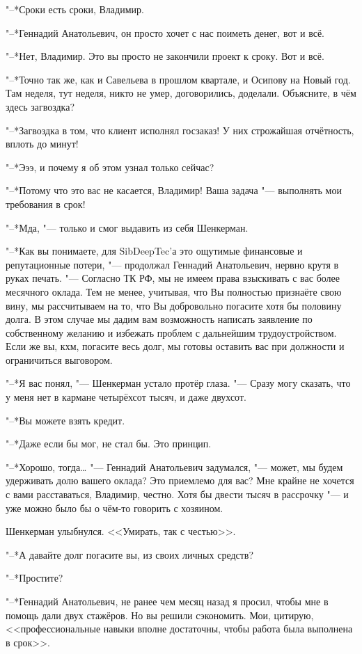 "--*Сроки есть сроки, Владимир.

"--*Геннадий Анатольевич, он просто хочет с нас поиметь денег, вот и всё.

"--*Нет, Владимир.
Это вы просто не закончили проект к сроку.
Вот и всё.

"--*Точно так же, как и Савельева в прошлом квартале, и Осипову на Новый год.
Там неделя, тут неделя, никто не умер, договорились, доделали.
Объясните, в чём здесь загвоздка?

"--*Загвоздка в том, что клиент исполнял госзаказ!
У них строжайшая отчётность, вплоть до минут!

"--*Эээ, и почему я об этом узнал только сейчас?

"--*Потому что это вас не касается, Владимир!
Ваша задача "--- выполнять мои требования в срок!

"--*Мда, "--- только и смог выдавить из себя Шенкерман.

"--*Как вы понимаете, для SibDeepTec'а это ощутимые финансовые и репутационные потери, "--- продолжал Геннадий Анатольевич, нервно крутя в руках печать.
"--- Согласно ТК РФ, мы не имеем права взыскивать с вас более месячного оклада.
Тем не менее, учитывая, что Вы полностью признаёте свою вину, мы рассчитываем на то, что Вы добровольно погасите хотя бы половину долга.
В этом случае мы дадим вам возможность написать заявление по собственному желанию и избежать проблем с дальнейшим трудоустройством.
Если же вы, кхм, погасите весь долг, мы готовы оставить вас при должности и ограничиться выговором.

"--*Я вас понял, "--- Шенкерман устало протёр глаза.
"--- Сразу могу сказать, что у меня нет в кармане четырёхсот тысяч, и даже двухсот.

"--*Вы можете взять кредит.

"--*Даже если бы мог, не стал бы.
Это принцип.

"--*Хорошо, тогда\ldots{} "--- Геннадий Анатольевич задумался, "--- может, мы будем удерживать долю вашего оклада?
Это приемлемо для вас?
Мне крайне не хочется с вами расставаться, Владимир, честно.
Хотя бы двести тысяч в рассрочку "--- и уже можно было бы о чём-то говорить с хозяином.

Шенкерман улыбнулся.
<<Умирать, так с честью>>.

"--*А давайте долг погасите вы, из своих личных средств?

"--*Простите?

"--*Геннадий Анатольевич, не ранее чем месяц назад я просил, чтобы мне в помощь дали двух стажёров.
Но вы решили сэкономить.
Мои, цитирую, <<профессиональные навыки вполне достаточны, чтобы работа была выполнена в срок>>.

